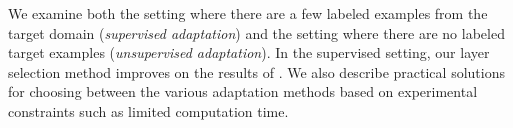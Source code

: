 We examine both the setting where there are a few labeled examples
from the target domain (\emph{supervised adaptation}) and the setting
where there are no labeled target examples (\emph{unsupervised
adaptation}). In the supervised setting, our layer selection method improves on the results of \cite{deeplearning-arxiv-2013,hoffman-iclr14}. We also describe practical solutions for choosing
between the various adaptation methods based on experimental
constraints such as limited computation time.

